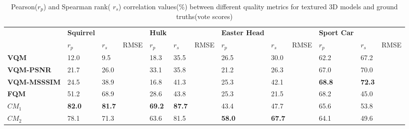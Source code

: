 \begin{table}[]
\centering
\caption{Pearson($r_p$) and Spearman rank( $r_s$) correlation values(\%) between different quality metrics for textured 3D models and ground truths(vote scores)}
\label{my-label}
\begin{tabular}{lllllllllllll}
                     & \textbf{Squirrel} &               &      & \textbf{Hulk} &               &      & \textbf{Easter Head} &               &      & \textbf{Sport Car} &               &      \\
                    & $r_p$                & $r_s$           & RMSE & $r_p$                & $r_s$            & RMSE & $r_p$                & $r_s$            & RMSE &$r_p$                & $r_s$            & RMSE \\
\textbf{VQM}        & 12.0     & 9.5  &      & 18.3 & 35.5 &      & 26.5        & 30.0 &      & 62.2      & 67.2 &      \\
\textbf{VQM-PSNR}   & 21.7     & 26.0 &      & 33.1 & 35.8 &      & 21.2        & 26.3 &      & 67.0      & 70.0 &      \\
\textbf{VQM-MSSSIM} & 24.5     & 38.9 &      & 16.8 & 41.3 &      & 25.3        & 42.1 &      & \textbf{68.8}      & \textbf{72.3} &      \\
\textbf{FQM}  \cite{Tian_2004}     & 51.2     & 68.9 &      & 28.6 & 43.8 &      & 25.3        & 21.5 &      & 68.2      & 45.0 &      \\
$CM_1$        & \textbf{82.0}     & \textbf{81.7} &      & \textbf{69.2} & \textbf{87.7} &      & 43.4        & 47.7 &      & 65.6      & 53.8 &      \\
$CM_2$        & 78.1     & 71.3 &      & 63.6 & 81.5 &      & \textbf{58.0 }       & \textbf{67.7} &      & 64.1      & 49.6 &     
\end{tabular}
\end{table}
